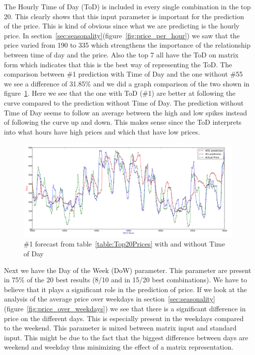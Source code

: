 The Hourly Time of Day (ToD) is included in every single combination in the top 20. This clearly shows that this input parameter is important for the prediction of the price. This is kind of obvious since what we are predicting is the hourly price. In section~\ref{sec:seasonality}(figure~\ref{fig:price_per_hour}) we saw that the price varied from 190 to 335 which strengthens the importance of the relationship between time of day and the price. Also the top 7 all have the ToD on matrix form which indicates that this is the best way of representing the ToD. The comparison between \#1 prediction with Time of Day and the one without \#55 we see a difference of 31.85\% and we did a graph comparison of the two shown in figure~\ref{fig:dowComparison}. Here we see that the one with ToD (\#1) are better at following the curve compared to the prediction without Time of Day. The prediction without Time of Day seems to follow an average between the high and low spikes instead of following the curve up and down. This makes sense since the ToD interprets into what hours have high prices and which that have low prices.

\begin{figure}[H]
\centering
\includegraphics[width=0.85\linewidth,natwidth=898,natheight=587]{billeder/PriceExperimentalAnalysis/dowComparison.png}
\caption{\#1 forecast from table~\ref{table:Top20Prices} with and without Time of Day}
\label{fig:dowComparison}
\end{figure}

Next we have the Day of the Week (DoW) parameter. This parameter are present in 75\% of the 20 best results (8/10 and in 15/20 best combinations). We have to believe that it plays a significant role in the prediction of price. If we look at the analysis of the average price over weekdays in section~\ref{sec:seasonality}(figure~\ref{fig:price_over_weekdays}) we see that there is a significant difference in price on the different days. This is especially present in the weekdays compared to the weekend. This parameter is mixed between matrix input and standard input. This might be due to the fact that the biggest difference between days are weekend and weekday thus minimizing the effect of a matrix representation. 

